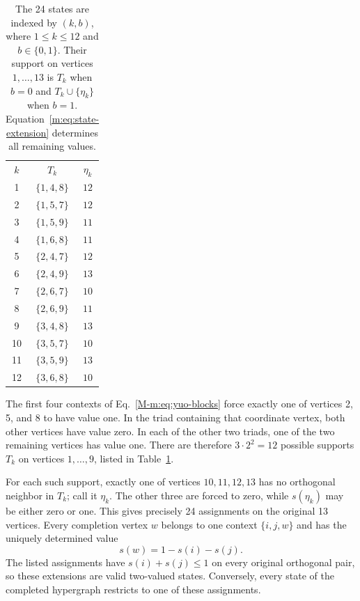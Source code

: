 \documentclass[aps,pra,reprint,superscriptaddress,longbibliography,nofootinbib,floatfix,10pt]{revtex4-2}
\theoremstyle{definition}
\begin{document}
\begin{table}[b]
\caption{The 24 states are indexed by $(k,b)$, where
$1\le k\le12$ and $b\in\{0,1\}$. Their support on vertices
$1,\ldots,13$ is $T_k$ when $b=0$ and $T_k\cup\{\eta_k\}$ when $b=1$.
Equation~\eqref{m:eq:state-extension} determines all remaining values.}
\label{m:tab:yo-states}
\begin{ruledtabular}
\begin{tabular}{ccc}
$k$ & $T_k$ & $\eta_k$\\
1 & $\{1,4,8\}$ & $12$ \\
2 & $\{1,5,7\}$ & $12$ \\
3 & $\{1,5,9\}$ & $11$ \\
4 & $\{1,6,8\}$ & $11$ \\
5 & $\{2,4,7\}$ & $12$ \\
6 & $\{2,4,9\}$ & $13$ \\
7 & $\{2,6,7\}$ & $10$ \\
8 & $\{2,6,9\}$ & $11$ \\
9 & $\{3,4,8\}$ & $13$ \\
10 & $\{3,5,7\}$ & $10$ \\
11 & $\{3,5,9\}$ & $13$ \\
12 & $\{3,6,8\}$ & $10$ \\
\end{tabular}
\end{ruledtabular}
\end{table}

The first four contexts of Eq.~\eqref{M-m:eq:yuo-blocks} force exactly one
of vertices 2, 5, and 8 to have value one. In the triad containing that
coordinate vertex, both other vertices have value zero. In each of the
other two triads, one of the two remaining vertices has value one. There
are therefore $3\cdot2^2=12$ possible supports $T_k$ on vertices
$1,\ldots,9$, listed in Table~\ref{m:tab:yo-states}.

For each such support, exactly one of vertices $10,11,12,13$ has no
orthogonal neighbor in $T_k$; call it $\eta_k$. The other three are forced
to zero, while $s(\eta_k)$ may be either zero or one. This gives precisely
24 assignments on the original 13 vertices. Every completion vertex $w$
belongs to one context $\{i,j,w\}$ and has the uniquely determined value
\begin{equation}\label{m:eq:state-extension}
s(w)=1-s(i)-s(j).
\end{equation}
The listed assignments have $s(i)+s(j)\le1$ on every original orthogonal
pair, so these extensions are valid two-valued states. Conversely, every
state of the completed hypergraph restricts to one of these assignments.
\end{document}
